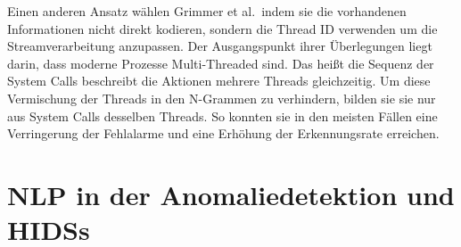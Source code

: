         Einen anderen Ansatz wählen Grimmer et al.\ indem sie die vorhandenen Informationen nicht direkt kodieren, sondern die Thread ID verwenden um die Streamverarbeitung anzupassen.
        Der Ausgangspunkt ihrer Überlegungen liegt darin, dass moderne Prozesse Multi-Threaded sind.
        Das heißt die Sequenz der System Calls beschreibt die Aktionen mehrere Threads gleichzeitig.
        Um diese Vermischung der Threads in den N-Grammen zu verhindern, bilden sie sie nur aus System Calls desselben Threads.
        So konnten sie in den meisten Fällen eine Verringerung der Fehlalarme und eine Erhöhung der Erkennungsrate erreichen.\cite{IDSTHREADGRIMMER2021}

        

    \section{\ac{NLP} in der Anomaliedetektion und \acp{HIDS}}\label{sec:related_nlp}

